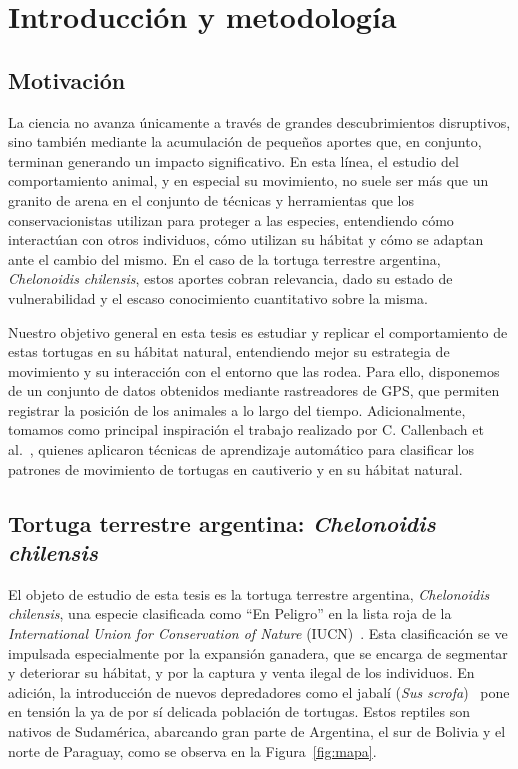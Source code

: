 \chapter{Introducción y metodología}\label{Capitulo_1}
\chapterquote{}{}

\section{Motivación}\label{I:mot}
La ciencia no avanza únicamente a través de grandes descubrimientos disruptivos, sino también mediante la acumulación de pequeños aportes que, 
en conjunto, terminan generando un impacto significativo. En esta línea, el estudio del comportamiento animal, y en especial su movimiento, 
no suele ser más que un granito de arena en el conjunto de técnicas y herramientas que los conservacionistas utilizan para proteger a las 
especies, entendiendo cómo interactúan con otros individuos, cómo utilizan su hábitat y cómo se adaptan ante el cambio del mismo. 
En el caso de la tortuga terrestre argentina, \textit{Chelonoidis chilensis}, estos aportes cobran relevancia, dado su estado de vulnerabilidad 
y el escaso conocimiento cuantitativo sobre la misma.

Nuestro objetivo general en esta tesis es estudiar y replicar el comportamiento de estas tortugas en su hábitat natural, entendiendo mejor su estrategia
de movimiento y su interacción con el entorno que las rodea. Para ello, disponemos de un conjunto de datos obtenidos mediante rastreadores de GPS,
que permiten registrar la posición de los animales a lo largo del tiempo. Adicionalmente, tomamos como principal inspiración el trabajo realizado
por C. Callenbach et al.~\cite{callenbach2025}, quienes aplicaron técnicas de aprendizaje automático para clasificar los patrones de movimiento de 
tortugas en cautiverio y en su hábitat natural.

\section{Tortuga terrestre argentina: \textit{Chelonoidis chilensis}}\label{I:tortuga}

El objeto de estudio de esta tesis es la tortuga terrestre argentina, \textit{Chelonoidis chilensis}, una especie clasificada como ``En Peligro''
en la lista roja de la \textit{International Union for Conservation of Nature} (IUCN)~\cite{kubisch2023chelonoidis}. Esta clasificación se ve impulsada especialmente 
por la expansión ganadera, que se encarga de segmentar y deteriorar su hábitat, y por la captura y venta ilegal de los individuos. En adición, la 
introducción de nuevos depredadores como el jabalí (\textit{Sus scrofa})~\cite{kubisch2014} pone en tensión la ya de por sí delicada población de tortugas. 
Estos reptiles son nativos de Sudamérica, abarcando gran parte de Argentina, el sur de Bolivia y el norte de Paraguay, como se observa en la Figura~\ref{fig:mapa}. 

